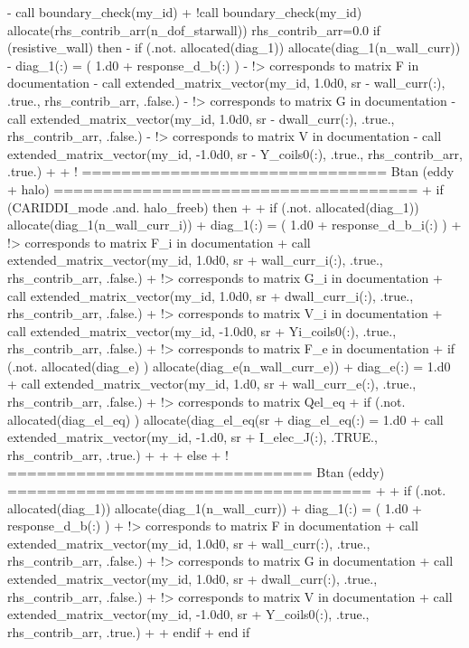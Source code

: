 -    call boundary_check(my_id)
+    !call boundary_check(my_id)
     allocate(rhs_contrib_arr(n_dof_starwall))
     rhs_contrib_arr=0.0
     if (resistive_wall) then
-      if (.not. allocated(diag_1)) allocate(diag_1(n_wall_curr))
-      diag_1(:) = ( 1.d0 + response_d_b(:) )
-      !> corresponds to matrix F in documentation
-      call extended_matrix_vector(my_id,  1.0d0, sr%
-          wall_curr(:), .true., rhs_contrib_arr, .false.)
-      !> corresponds to matrix G in documentation
-      call extended_matrix_vector(my_id,  1.0d0, sr%
-          dwall_curr(:), .true., rhs_contrib_arr, .false.)
-      !> corresponds to matrix V in documentation
-      call extended_matrix_vector(my_id, -1.0d0, sr%
-          Y_coils0(:), .true., rhs_contrib_arr, .true.)
+
+      ! ===============================  Btan (eddy + halo) ===================================== 
+      if (CARIDDI_mode .and. halo_freeb) then
+
+        if (.not. allocated(diag_1)) allocate(diag_1(n_wall_curr_i))
+        diag_1(:) = ( 1.d0 + response_d_b_i(:) )
+        !> corresponds to matrix F_i in documentation
+        call extended_matrix_vector(my_id,  1.0d0, sr%
+            wall_curr_i(:), .true., rhs_contrib_arr, .false.)
+        !> corresponds to matrix G_i in documentation
+        call extended_matrix_vector(my_id,  1.0d0, sr%
+            dwall_curr_i(:), .true., rhs_contrib_arr, .false.)
+        !> corresponds to matrix V_i in documentation
+        call extended_matrix_vector(my_id, -1.0d0, sr%
+            Yi_coils0(:), .true., rhs_contrib_arr, .false.)
+        !> corresponds to matrix F_e in documentation
+        if (.not. allocated(diag_e) ) allocate(diag_e(n_wall_curr_e))
+        diag_e(:) = 1.d0
+        call extended_matrix_vector(my_id, 1.d0, sr%
+               wall_curr_e(:), .true., rhs_contrib_arr, .false.)
+        !> corresponds to matrix Qel_eq
+        if (.not. allocated(diag_el_eq) ) allocate(diag_el_eq(sr%
+        diag_el_eq(:) = 1.d0
+        call extended_matrix_vector(my_id, -1.d0, sr%
+              I_elec_J(:), .TRUE., rhs_contrib_arr, .true.)
+
+        
+      else
+      ! ===============================  Btan (eddy) ===================================== 
+
+        if (.not. allocated(diag_1)) allocate(diag_1(n_wall_curr))
+        diag_1(:) = ( 1.d0 + response_d_b(:) )
+        !> corresponds to matrix F in documentation
+        call extended_matrix_vector(my_id,  1.0d0, sr%
+            wall_curr(:), .true., rhs_contrib_arr, .false.)
+        !> corresponds to matrix G in documentation
+        call extended_matrix_vector(my_id,  1.0d0, sr%
+            dwall_curr(:), .true., rhs_contrib_arr, .false.)
+        !> corresponds to matrix V in documentation
+        call extended_matrix_vector(my_id, -1.0d0, sr%
+            Y_coils0(:), .true., rhs_contrib_arr, .true.)
+
+      endif
+
     end if
 
